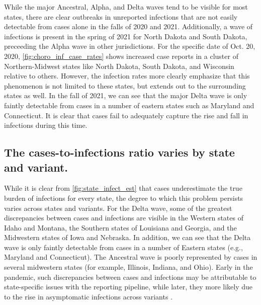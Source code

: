 While the major Ancestral, Alpha, and Delta waves tend to be visible for most
states, there are clear outbreaks in unreported infections that are not easily
detectable from cases alone in the falls of 2020 and 2021. Additionally, a wave
of infections is present in the spring of 2021 for North Dakota and South
Dakota, preceeding the Alpha wave in other jurisdictions. For the specific date
of Oct. 20, 2020, \autoref{fig:choro_inf_case_rates} shows increased case
reports in a cluster of Northern-Midwest states like North Dakota, South Dakota,
and Wisconsin relative to others. However, the infection rates more clearly
emphasize that this phenomenon is not limited to these states, but extends out
to the surrounding states as well. In the fall of 2021, we can see that the
major Delta wave is only faintly detectable from cases in a number of eastern
states such as Maryland and Connecticut. It is clear that cases fail to
adequately capture the rise and fall in infections during this time.

\subsection{The cases-to-infections ratio varies by state and variant.}
\label{sec:case-infection-ratio}

While it is clear from \autoref{fig:state_infect_est} that cases underestimate
the true burden of infections for every state, the degree to which this problem
persists varies across states and variants. For the Delta wave, some of
the greatest discrepancies between cases and infections are visible in the
Western states of Idaho and Montana, the Southern states of Louisiana and
Georgia, and the Midwestern states of Iowa and Nebraska. In addition, we can see
that the Delta wave is only faintly detectable from cases in a number of Eastern
states (e.g., Maryland and Connecticut). The Ancestral wave is poorly
represented  by cases in several
midwestern states (for example, Illinois, Indiana, and Ohio). Early
in the pandemic, such discrepancies between cases and infections may be
attributable to state-specific issues with the reporting pipeline, while later, they more likely due to the rise in asymptomatic infections
across variants \citep{oph2022covid, garrett2022high}. 

